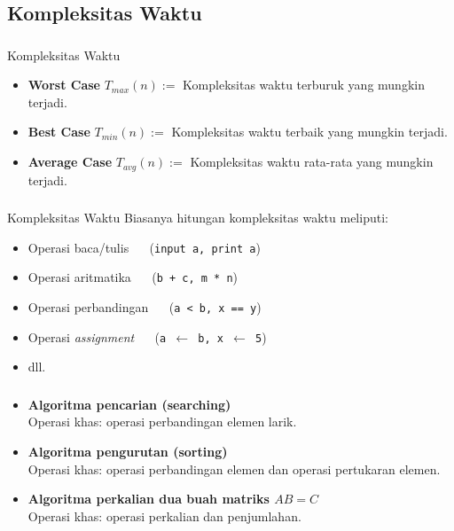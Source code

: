 \documentclass{../praktikum-ppt}
\begin{document}
\subsection{Kompleksitas Waktu}
\begin{frame}
  \frametitle{\insertsection}
  \framesubtitle{\insertsubsection}
  \begin{block}{Kompleksitas Waktu}
    \begin{itemize}
      \item \textbf{Worst Case} $T_{max}(n):=$ Kompleksitas waktu terburuk yang mungkin terjadi.
      \item \textbf{Best Case} $T_{min}(n):=$ Kompleksitas waktu terbaik yang mungkin terjadi.
      \item \textbf{Average Case} $T_{avg}(n):=$ Kompleksitas waktu rata-rata yang mungkin terjadi.
    \end{itemize}
  \end{block}
\end{frame}
\begin{frame}
  \frametitle{\insertsection}
  \framesubtitle{\insertsubsection}
  \begin{block}{Kompleksitas Waktu}
  Biasanya hitungan kompleksitas waktu meliputi:
  \begin{itemize}
    \item Operasi baca/tulis $\quad$ \textcolor{green!50!black}{(\texttt{input a, print a})}
    \item Operasi aritmatika $\quad$ \textcolor{green!50!black}{(\texttt{b + c, m * n})}
    \item Operasi perbandingan $\quad$ \textcolor{green!50!black}{(\texttt{a < b, x == y})}
    \item Operasi \textit{assignment} $\quad$ \textcolor{green!50!black}{(\texttt{a $\leftarrow$ b, x $\leftarrow$ 5})}
    \item dll.
  \end{itemize}
  \end{block}
\end{frame}

\begin{frame}
  \frametitle{\insertsection}
  \framesubtitle{\insertsubsection}
  \begin{itemize}
    \item \textbf{Algoritma pencarian (searching)} \\
    Operasi khas: operasi perbandingan elemen larik.
    
    \item \textbf{Algoritma pengurutan (sorting)} \\
    Operasi khas: operasi perbandingan elemen dan operasi pertukaran elemen.
    
    \item \textbf{Algoritma perkalian dua buah matriks \( AB = C \)} \\
    Operasi khas: operasi perkalian dan penjumlahan.
\end{itemize}
\end{frame}
\end{document}
